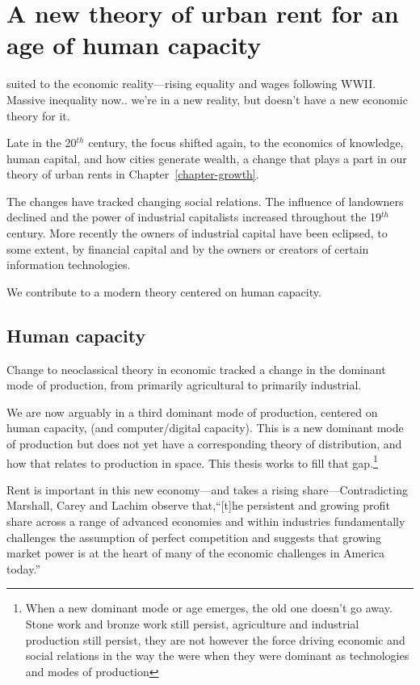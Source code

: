 \section{A new theory of urban rent for an age of human capacity}
suited to the economic reality---rising equality and wages following WWII. Massive inequality now..
we're in a new reality, but doesn't have a new economic theory for it. 

Late in the 20$^{th}$ century, the focus shifted again, to the economics of  knowledge, human capital, and how cities generate wealth, a change that plays a part in  our theory of urban rents in Chapter~\ref{chapter-growth}. 
 
The changes have tracked changing social relations. The influence of landowners declined and the power of  industrial capitalists increased throughout the 19$^{th}$ century. More recently the owners of industrial capital have been eclipsed, to some extent, by financial capital and by the owners or creators of certain information technologies.

We contribute to a modern theory centered on human capacity.

\subsection{Human capacity}
Change to neoclassical theory in economic tracked a change in the dominant mode of production, from primarily agricultural to primarily industrial.

We are now arguably in a third dominant mode of production, centered on  human capacity, (and computer/digital capacity). This is a new dominant mode of production but does not yet have a corresponding theory of distribution, and how that relates to production in space. 
This thesis works to fill that gap.\footnote{When a new dominant mode or age emerges, the old one doesn't go away. Stone work and bronze work still persist, agriculture and industrial production still persist, they are not however the force driving economic and social relations in the way the were when they were dominant as technologies and modes of production\cite{oldworldsdon'tdie}}

Rent is important in this new economy---and takes a rising share---Contradicting Marshall, Carey and Lachim \cite{careySomethingNothingHow2019} observe that,``[t]he persistent and growing profit share across a range of advanced economies and within industries fundamentally challenges the assumption of perfect competition and suggests that growing market power is at the heart of many of the economic challenges in America today.''


